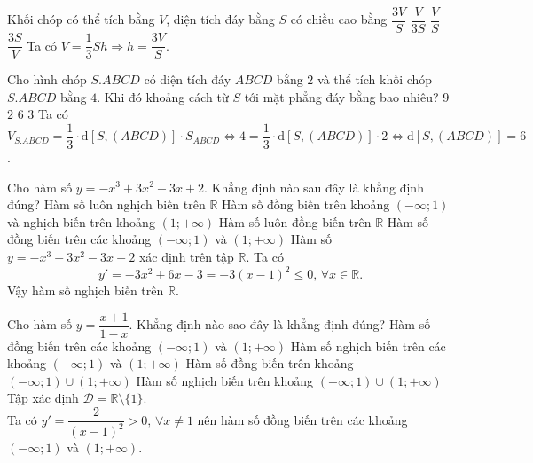 \begin{ex}%
    Khối chóp có thể tích bằng $V$, diện tích đáy bằng $S$ có chiều cao bằng
    \choice
    {\True $\dfrac{3V}{S}$}
    {$\dfrac{V}{3S}$}
    {$\dfrac{V}{S}$}
    {$\dfrac{3S}{V}$}
    \loigiai
    {Ta có $V=\dfrac{1}{3}Sh\Rightarrow h=\dfrac{3V}{S}$.}
\end{ex}

\begin{ex}%
Cho hình chóp $S.ABCD$ có diện tích đáy $ABCD$ bằng $2$ và thể tích khối chóp $S.ABCD$ bằng $4$. Khi đó khoảng cách từ $S$ tới mặt phẳng đáy bằng bao nhiêu?
	\choice
	{$9$}
	{$2$}
	{$6$}
	{\True $3$}
	\loigiai
	{Ta có $V_{S.ABCD}=\dfrac{1}{3}\cdot \mathrm{d}[S,(ABCD)] \cdot S_{ABCD}\Leftrightarrow 4=\dfrac{1}{3}\cdot \mathrm{d}[S,(ABCD)] \cdot 2\Leftrightarrow \mathrm{d}[S,(ABCD)]=6$.}
\end{ex}

\begin{ex}%
    Cho hàm số $y=-x^3+3x^2-3x+2$. Khẳng định nào sau đây là khẳng định đúng?
    \choice
    {\True Hàm số luôn nghịch biến trên $\mathbb{R}$}
    {Hàm số đồng biến trên khoảng $(-\infty ;1)$ và nghịch biến trên khoảng $(1;+\infty)$}
    {Hàm số luôn đồng biến trên $\mathbb{R}$}
    {Hàm số đồng biến trên các khoảng $(-\infty ;1)$ và $(1;+\infty)$}
    \loigiai
    {Hàm số $y=-x^3+3x^2-3x+2$ xác định trên tập $\mathbb{R}$. Ta có
    \[y'=-3x^2+6x-3=-3(x-1)^2\leq 0,\, \forall x\in \mathbb{R}.\]
    Vậy hàm số nghịch biến trên $\mathbb{R}$.}
\end{ex}

\begin{ex}%
    Cho hàm số $y=\dfrac{x+1}{1-x}$. Khẳng định nào sao đây là khẳng định đúng?
    \choice
    {\True Hàm số đồng biến trên các khoảng $(-\infty ;1 )$ và $(1;+\infty)$}
    {Hàm số nghịch biến trên các khoảng $(-\infty ;1)$ và $(1;+\infty)$}
    {Hàm số đồng biến trên khoảng $(-\infty ;1)\cup (1;+\infty)$}
    {Hàm số nghịch biến trên khoảng $(-\infty ;1)\cup (1;+\infty)$}
    \loigiai
    {Tập xác định $\mathscr{D}=\mathbb{R}\setminus\{1\}$.\\
    Ta có $y'=\dfrac{2}{(x-1)^2}>0,\,\forall x\neq 1$ nên hàm số đồng biến trên các khoảng $(-\infty;1)$ và $(1;+\infty)$.}
\end{ex}

